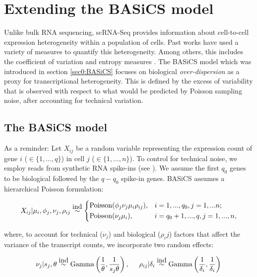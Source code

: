 
\section{Extending the  BASiCS model}

Unlike bulk RNA sequencing, scRNA-Seq provides information about cell-to-cell expression heterogeneity within a population of cells. Past works have used a variety of measures to quantify this heterogeneity. Among others, this includes the coefficient of variation \citep[CV,][]{Brennecke2013} and entropy measures \citep{Richard2016}. The BASiCS model \citep{Vallejos2015BASiCS, Vallejos2016} which was introduced in section \ref{sec0:BASiCS} focuses on biological \textit{over-dispersion} as a proxy for transcriptional heterogeneity. This is defined by the excess of variability that is observed with respect to what would be predicted by Poisson sampling noise, after accounting for technical variation. 

\subsection{The BASiCS model}

As a reminder: Let $X_{ij}$ be a random variable representing the expression count of gene $i$ ($ \in \{1, \ldots, q\}$) in cell $j$ ($\in \{ 1, \ldots ,n\}$).  To control for technical noise, we employ reads from synthetic RNA spike-ins (see \citep{Jiang2011}). We assume the first $q_0$ genes to be biological followed by the $q-q_0$ spike-in genes. BASiCS assumes a hierarchical Poisson formulation: 

\begin{equation} \label{eq::PoissonBASiCS}
 X_{ij}|\mu_i,\phi_j,\nu_j,\rho_{ij} \stackrel{\mbox{ind}}{\sim}
 \left\lbrace
  \begin{aligned}
    &\text{Poisson}(\phi_j\nu_j\mu_i\rho_{ij}), && i=1,...,q_0,j=1,...n;  \\ 
    &\text{Poisson}(\nu_j\mu_i), && i=q_0+1,...,q,j=1,...,n,    	    
  \end{aligned}
\right.
\end{equation} 

where, to account for technical ($\nu_j$) and biological ($\rho_ij$) factors that affect the variance of the transcript counts, we incorporate two random effects: 

\begin{equation} \label{eq::RandomEffectsBASiCS}
\nu_j|s_j,\theta \stackrel{\mbox{ind}}{\sim} \text{Gamma}\left(\frac{1}{\theta},\frac{1}{s_j\theta}\right), \hspace{0.5cm} \rho_{ij}|\delta_i  \stackrel{\mbox{ind}}{\sim} \text{Gamma}\left(\frac{1}{\delta_i},\frac{1}{\delta_i}\right)\\
\end{equation} 

